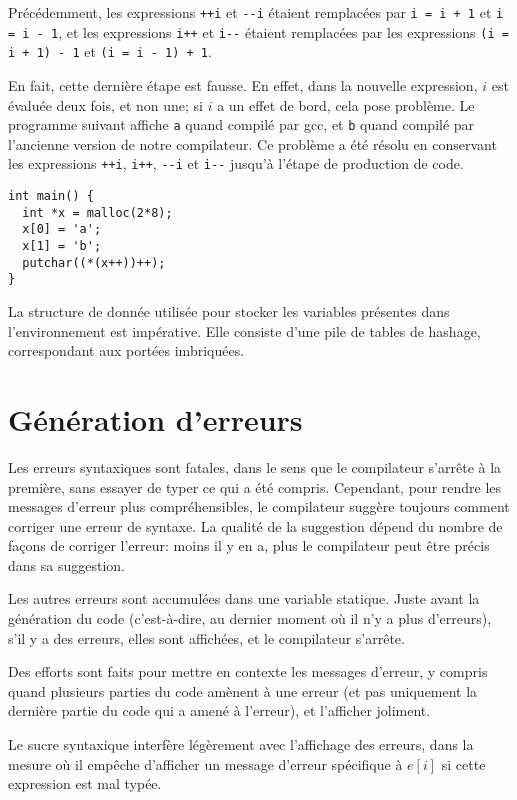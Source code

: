 \documentclass{scrartcl}
\begin{document}
Précédemment, les expressions \verb|++i| et \verb|--i|
étaient remplacées par \verb|i = i + 1| et \verb|i = i - 1|, et les expressions \verb|i++| et \verb|i--| étaient remplacées
par les expressions \verb|(i = i + 1) - 1| et \verb|(i = i - 1) + 1|.\par
En fait, cette dernière étape est fausse. En effet, dans la nouvelle expression,
\(i\) est évaluée deux fois, et non une; si \(i\) a un effet de bord, cela pose
problème. Le programme suivant affiche \verb|a| quand compilé par gcc, et
\verb|b| quand compilé par l'ancienne version de notre compilateur. Ce problème a été résolu
en conservant les expressions \verb|++i|, \verb|i++|, \verb|--i| et \verb|i--| jusqu'à l'étape de production de code.
\begin{verbatim}
int main() {
  int *x = malloc(2*8);
  x[0] = 'a';
  x[1] = 'b';
  putchar((*(x++))++);
}
\end{verbatim}
\par
La structure de donnée utilisée pour stocker les variables présentes dans
l'environnement est impérative. Elle consiste d'une pile de tables de hashage,
correspondant aux portées imbriquées.

\section*{Génération d'erreurs}
Les erreurs syntaxiques sont fatales, dans le sens que le compilateur s'arrête
à la première, sans essayer de typer ce qui a été compris. Cependant, pour rendre
les messages d'erreur plus compréhensibles, le compilateur suggère toujours
comment corriger une erreur de syntaxe. La qualité de la suggestion dépend du
nombre de façons de corriger l'erreur: moins il y en a, plus le compilateur peut
être précis dans sa suggestion.\par
Les autres erreurs sont accumulées dans une variable statique. Juste avant la génération
du code (c'est-à-dire, au dernier moment où il n'y a plus d'erreurs), s'il y a
des erreurs, elles sont affichées, et le compilateur s'arrête.\par
Des efforts sont faits pour mettre en contexte les messages d'erreur, y compris
quand plusieurs parties du code amènent à une erreur (et pas uniquement la
dernière partie du code qui a amené à l'erreur), et l'afficher joliment.\par
Le sucre syntaxique interfère légèrement avec l'affichage des erreurs, dans la
mesure où il empêche d'afficher un message d'erreur spécifique à \(e[i]\) si
cette expression est mal typée.
\end{document}
